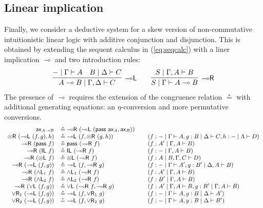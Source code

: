 \documentclass[submission,copyright,creativecommons]{eptcs}
\theoremstyle{definition}
\newcommand{\tl}{\otimes \mathsf{L}}
\newcommand{\tr}{\otimes \mathsf{R}}
\newcommand{\lright}{{\multimap}\mathsf{R}}
\newcommand{\lleft}{{\multimap}\mathsf{L}}
\newcommand{\pass}{\mathsf{pass}}
\newcommand{\unitl}{\mathsf{IL}}
\newcommand{\andlone}{\land \mathsf{L}_{1}}
\newcommand{\andltwo}{\land \mathsf{L}_{2}}
\newcommand{\orl}{\lor \mathsf{L}}
\newcommand{\orrone}{\lor \mathsf{R}_{1}}
\newcommand{\orrtwo}{\lor \mathsf{R}_{2}}
\newcommand{\ax}{\mathsf{ax}}
\newcommand{\lolli}{\multimap}
\newcommand{\SkNMILLA}{$\mathtt{SkNMILLA}$}
\begin{document}
\subsection{Linear implication}\label{subsec:impl}
Finally, we consider a deductive system for a skew version of non-commutative intuitionistic linear logic with additive conjunction and disjunction.
This is obtained by extending the sequent calculus in (\ref{eq:seqcalc}) with a liner implication $\lolli$ and two introduction rules:
\begin{displaymath}
  \begin{array}{c}
    \infer[\lleft]{A \lolli B \mid \Gamma , \Delta \vdash C}{
      - \mid \Gamma \vdash A
      &
      B \mid \Delta \vdash C
    }
    \qquad
    \infer[\lright]{S \mid \Gamma \vdash A \lolli B}{S \mid \Gamma , A \vdash B}
  \end{array}
\end{displaymath}
The presence of $\lolli$ requires the extension of the congruence relation $\circeq$ with additional generating equations: an $\eta$-conversion and more permutative conversions.
\begin{equation*}\label{fig:circeq:impl}
  \small
  \begin{array}{rlll}
  \ax_{A \lolli B} &\circeq \lright \text{ } (\lleft \text{ } (\pass \text{ } \ax_{A}, \ax_{B} ))
  \\
  \tr \text{ } (\lleft \text{ } (f , g), h) & \circeq \lleft \text{ } (f, \tr \text{ } (g, h)) &&(f: {-} \mid \Gamma \vdash A, g : B \mid \Delta \vdash C, h : {-} \mid \Lambda \vdash D)
  \\
  \lright \text{ } (\pass \text{ } f) &\circeq \pass \text{ } (\lright \text{ } f) &&(f : A' \mid \Gamma , A \vdash B)
  \\
  \lright \text{ } (\unitl \text{ } f) &\circeq \unitl \text{ } (\lright \text{ } f) &&(f : {-} \mid \Gamma , A \vdash B)
  \\
  \lright \text{ } (\tl \text{ } f) &\circeq \tl \text{ } (\lright \text{ } f) &&(f : A \mid B , \Gamma , C \vdash D)
  \\
  \lright \text{ } (\lleft \text{ } (f, g)) &\circeq \lleft \text{ } (f, \lright \text{ } g) &&(f : {-} \mid \Gamma \vdash A', g : B' \mid \Delta , A \vdash B)
  \\
  \lright \ (\andlone \ f) &\circeq \andlone \ (\lright \ f) &&(f : A' \mid \Gamma , A \vdash B)
  \\
  \lright \ (\andltwo \ f) &\circeq \andltwo \ (\lright \ f) &&(f : B' \mid \Gamma , A \vdash B)
  \\
  \lright \ (\orl \ (f ,g)) &\circeq \orl \ (\lright \ f , \lright \ g) &&(f : A' \mid \Gamma , A \vdash B , g : B' \mid \Gamma , A \vdash B)
  \\
  \orrone \ (\lleft \  (f , g)) &\circeq \lleft \ (f , \orrone \ g) &&(f : - \mid \Gamma \vdash A , g : B \mid \Delta \vdash A')
  \\
  \orrtwo \ (\lleft \  (f , g)) &\circeq \lleft \ (f , \orrtwo \ g) &&(f : - \mid \Gamma \vdash A , g : B \mid \Delta \vdash B')
  \end{array}
\end{equation*}
\end{document}
